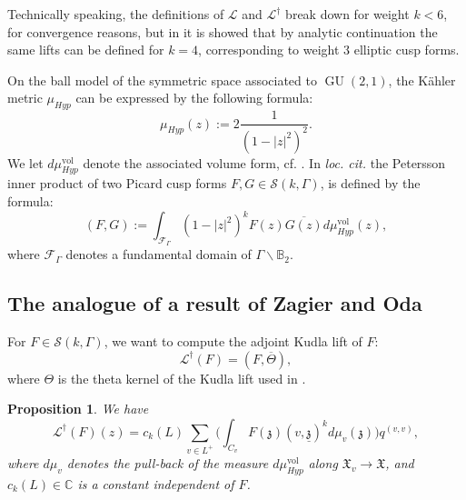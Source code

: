 \documentclass[12pt,a4paper,reqno]{amsart}
\theoremstyle{definition}
\numberwithin{definition}{subsection}
\theoremstyle{definition}
\numberwithin{Definition}{subsection}
\theoremstyle{remark}
\theoremstyle{remark}
\numberwithin{Remark}{subsection}
\theoremstyle{remark}
\theoremstyle{plain}
\numberwithin{Theorem}{subsection}
\theoremstyle{plain}
\theoremstyle{plain}
\theoremstyle{plain}
\theoremstyle{plain}
\theoremstyle{plain}
\theoremstyle{plain}
\newtheorem{Proposition}[Theorem]{Proposition}
\theoremstyle{plain}
\newcommand*{\Cc}{\mathbb{C}}
\DeclareMathOperator{\GU}{GU}
\begin{document}
Technically speaking, the definitions of $\mathcal{L}$ and $\mathcal{L}^\dagger$ break down for weight $k<6$, for convergence reasons, but in \cite{tongwang} it is showed that by analytic continuation the same lifts can be defined for $k=4$, corresponding to weight $3$ elliptic cusp forms. 

On the ball model of the symmetric space associated to $\GU(2,1)$, the K\"ahler metric $\mu_{Hyp}$ can be expressed by the following formula:
\[
\mu_{Hyp}(z):=2\frac{1}{(1-|z|^2)^2}.
\]
We let $d\mu_{Hyp}^{\text{vol}}$ denote the associated volume form, cf. \cite[p. 4]{baskar}. In \emph{loc. cit.} the Petersson inner product of two Picard cusp forms $F,G\in \mathscr{S}(k,\Gamma)$, is defined by the formula:
\[
( F, G):=\int_{\mathcal{F}_{\Gamma}}(1-|z|^2)^kF(z)\overline{G(z)}d\mu_{Hyp}^{\text{vol}}(z),
\]
where $\mathcal{F}_{\Gamma}$ denotes a fundamental domain of $\Gamma\backslash \mathbb{B}_2$.

\subsection{The analogue of a result of Zagier and Oda}
For $F\in \mathscr{S}(k,\Gamma)$, we want to compute the adjoint Kudla lift of $F$:
\[
\mathcal{L}^\dagger(F)=(F,\overline{\Theta}),
\]
where $\Theta$ is the theta kernel of the Kudla lift used in \cite[p. 13]{iudica}.
\begin{Proposition}
\label{analogue}
We have
\[
\mathcal{L}^\dagger(F)(z)=c_k(L)\sum_{v\in L^+}\Big(\int_{C_v}F(\mathfrak{z})(v,\underline{\mathfrak{z}})^{k}d\mu_{v}(\mathfrak{z})\Big)q^{(v,v)},
\]
where $d\mu_v$ denotes the pull-back of the measure $d\mu_{Hyp}^{\text{vol}}$ along $\mathfrak{X}_v\to \mathfrak{X}$, and $c_k(L)\in \Cc$ is a constant independent of $F$.
\end{Proposition}
\end{document}
